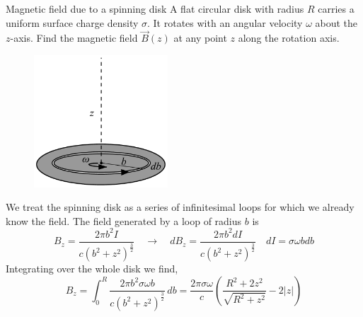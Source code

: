 \documentclass[makesolutionspdf]{esg8022pset}
\begin{document}
\begin{problem}{Magnetic field due to a spinning disk}
  A flat circular disk with radius $R$ carries a uniform surface charge density
  $\sigma$. It rotates with an angular velocity $\omega$ about the $z$-axis.
  Find the magnetic field $\vec{B}(z)$ at any point $z$ along the rotation
  axis.
  
    \begin{figure}[H]
    \centering
    \includegraphics[width = 5cm]{Spinningdisk}
  \end{figure}
\end{problem}

\begin{solution}
  We treat the spinning disk as a series of infinitesimal loops for which we
  already know the field.  
   The field generated by a loop of radius $b$ is
  $$B_z = \frac{2\pi b^2 I}{c(b^2+z^2)^{\frac{3}{2}}}\quad\to\quad dB_z = \frac{2\pi b^2 dI}{c(b^2+z^2)^{\frac{3}{2}}} \quad dI = \sigma\omega bdb$$
  Integrating over the whole disk we find,
  $$B_z = \int_0^R \frac{2\pi b^2 \sigma\omega b}{c(b^2+z^2)^{\frac{3}{2}}}\,db =
  \frac{2\pi\sigma\omega}{c}\left(\frac{R^2+2z^2}{\sqrt{R^2+z^2}}-2|z|\right)
  $$
\end{solution}
\end{document}
